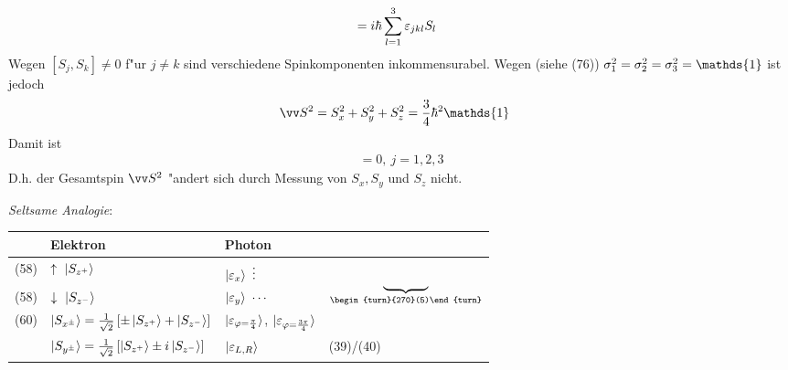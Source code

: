 \documentclass[a4paper]{scrartcl}
\newcommand{\dOne}{\ensuremath \mathds{1}}
\newcommand{\eps}{\ensuremath \varepsilon}
\renewcommand{\phi}{\ensuremath \varphi}
\begin{document}
{\begin{align}
[S_j, S_k] & = i\hbar \sum_{l=1}^3 \eps_{jkl} S_l
\end{align}
Wegen $[S_j, S_k] \neq 0$ f"ur $j \neq k$ sind verschiedene Spinkomponenten inkommensurabel. Wegen (siehe (76)) $\sigma_1^2 = \sigma^2_2 = \sigma_3^2 = \dOne$ ist jedoch
\begin{align}
\vv S^2 & = S_x^2 + S_y^2 + S_z^2 = \frac34 \hbar^2 \dOne
\end{align}
Damit ist 
\begin{align}
[\vv S^2, S_j ] = 0, \ j = 1,2,3
\end{align}
D.h. der Gesamtspin $\vv S^2$ "andert sich durch Messung von $S_x, S_y$ und $S_z$ nicht.

\emph{Seltsame Analogie}:

\begin{tabular}{r l | l l}
& Elektron & Photon \\
\hline
(58) & $\uparrow \ \ket {S_{z^+}}$ & $\ket{ \eps_x} \ \vdots$ & \multirow{3}{*}{ \begin{turn}{90}
$\underbrace{\hspace{3.5em}}_{\begin{turn}{270}(5)\end{turn}}$
\end{turn}} \\
(58) & $\downarrow \ \ket{ S_{z^-}}$ & $\ket{ \eps_y} \ \cdots$ \\
(60) &  $\ket{ S_{x^\pm}} = \frac1{\sqrt2} \left[ \pm \ket{S_{z^+}} + \ket{S_{z^-}} \right]$ & $\ket{\eps_{\phi = \frac\pi4}}$, $\ket{\eps_{\phi = \frac{3\pi}4}}$ \\
 & $\ket{S_{y^\pm}} = \frac1{\sqrt2} \left[ \ket{S_{z^+}} \pm i \ket{S_{z^-}} \right]$ & $\ket{\eps_{L,R}}$ & (39)/(40)
\end{tabular}

}
\end{document}
